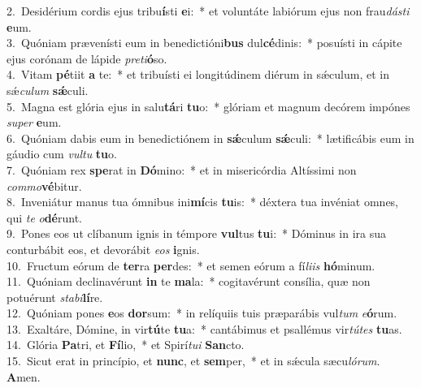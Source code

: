 {2.~}Desidérium cordis ejus tribu\textbf{í}sti \textbf{e}i:~* et voluntáte labiórum ejus non frau\textit{dá}\textit{sti} \textbf{e}um.\\
{3.~}Quóniam prævenísti eum in benedictióni\textbf{bus} dul\textbf{cé}dinis:~* posuísti in cápite ejus corónam de lápide \textit{pre}\textit{ti}\textbf{ó}so.\\
{4.~}Vitam \textbf{pé}tiit \textbf{a} te:~* et tribuísti ei longitúdinem diérum in sǽculum, et in sǽ\textit{cu}\textit{lum} \textbf{sǽ}culi.\\
{5.~}Magna est glória ejus in salu\textbf{tá}ri \textbf{tu}o:~* glóriam et magnum decórem impónes \textit{su}\textit{per} \textbf{e}um.\\
{6.~}Quóniam dabis eum in benedictiónem in \textbf{sǽ}culum \textbf{sǽ}culi:~* lætificábis eum in gáudio cum \textit{vul}\textit{tu} \textbf{tu}o.\\
{7.~}Quóniam rex \textbf{spe}rat in \textbf{Dó}mino:~* et in misericórdia Altíssimi non \textit{com}\textit{mo}\textbf{vé}bitur.\\
{8.~}Inveniátur manus tua ómnibus ini\textbf{mí}cis \textbf{tu}is:~* déxtera tua invéniat omnes, qui \textit{te} \textit{o}\textbf{dé}runt.\\
{9.~}Pones eos ut clíbanum ignis in témpore \textbf{vul}tus \textbf{tu}i:~* Dóminus in ira sua conturbábit eos, et devorábit \textit{e}\textit{os} \textbf{i}gnis.\\
{10.~}Fructum eórum de \textbf{ter}ra \textbf{per}des:~* et semen eórum a fí\textit{li}\textit{is} \textbf{hó}minum.\\
{11.~}Quóniam declinavérunt \textbf{in} te \textbf{ma}la:~* cogitavérunt consília, quæ non potuérunt \textit{sta}\textit{bi}\textbf{lí}re.\\
{12.~}Quóniam pones \textbf{e}os \textbf{dor}sum:~* in relíquiis tuis præparábis vul\textit{tum} \textit{e}\textbf{ó}rum.\\
{13.~}Exaltáre, Dómine, in vir\textbf{tú}te \textbf{tu}a:~* cantábimus et psallémus vir\textit{tú}\textit{tes} \textbf{tu}as.\\
{14.~}Glória \textbf{Pa}tri, et \textbf{Fí}lio,~* et Spirí\textit{tu}\textit{i} \textbf{San}cto.\\
{15.~}Sicut erat in princípio, et \textbf{nunc}, et \textbf{sem}per,~* et in sǽcula sæcu\textit{ló}\textit{rum}. \textbf{A}men.\\
